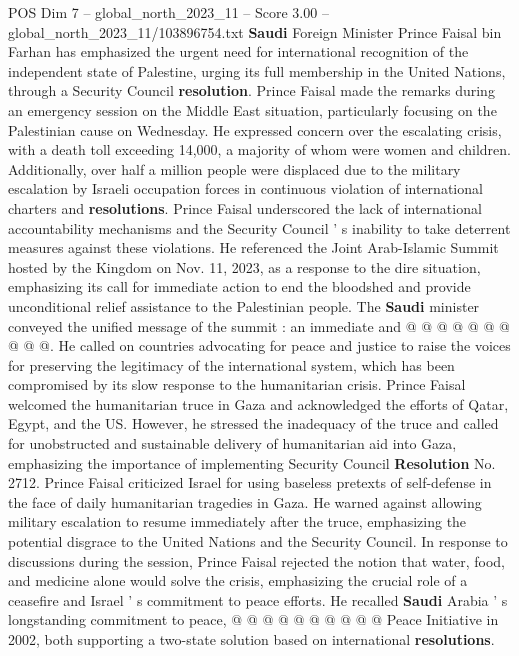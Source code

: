 \begin{textsample}{POS Dim 7 – global\_north\_2023\_11 – Score 3.00 – global\_north\_2023\_11/103896754.txt}  \label{ex:f7_pos_403}
\textbf{Saudi} Foreign Minister Prince Faisal bin Farhan has emphasized the urgent need for international recognition of the independent state of Palestine, urging its full membership in the United Nations, through a Security Council \textbf{resolution}.
Prince Faisal made the remarks during an emergency session on the Middle East situation, particularly focusing on the Palestinian cause on Wednesday.
He expressed concern over the escalating crisis, with a death toll exceeding 14,000, a majority of whom were women and children.
Additionally, over half a million people were displaced due to the military escalation by Israeli occupation forces in continuous violation of international charters and \textbf{resolutions}.
Prince Faisal underscored the lack of international accountability mechanisms and the Security Council ' s inability to take deterrent measures against these violations.
He referenced the Joint Arab-Islamic Summit hosted by the Kingdom on Nov. 11, 2023, as a response to the dire situation, emphasizing its call for immediate action to end the bloodshed and provide unconditional relief assistance to the Palestinian people.
The \textbf{Saudi} minister conveyed the unified message of the summit : an immediate and @ @ @ @ @ @ @ @ @ @.
He called on countries advocating for peace and justice to raise the voices for preserving the legitimacy of the international system, which has been compromised by its slow response to the humanitarian crisis.
Prince Faisal welcomed the humanitarian truce in Gaza and acknowledged the efforts of Qatar, Egypt, and the US.
However, he stressed the inadequacy of the truce and called for unobstructed and sustainable delivery of humanitarian aid into Gaza, emphasizing the importance of implementing Security Council \textbf{Resolution} No. 2712.
Prince Faisal criticized Israel for using baseless pretexts of self-defense in the face of daily humanitarian tragedies in Gaza.
He warned against allowing military escalation to resume immediately after the truce, emphasizing the potential disgrace to the United Nations and the Security Council.
In response to discussions during the session, Prince Faisal rejected the notion that water, food, and medicine alone would solve the crisis, emphasizing the crucial role of a ceasefire and Israel ' s commitment to peace efforts.
He recalled \textbf{Saudi} Arabia ' s longstanding commitment to peace, @ @ @ @ @ @ @ @ @ @ Peace Initiative in 2002, both supporting a two-state solution based on international \textbf{resolutions}.

\end{textsample}
